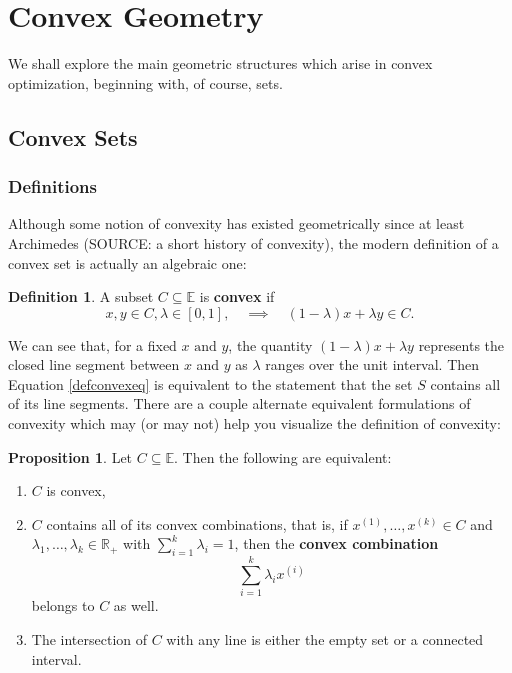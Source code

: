 \documentclass{article}
\numberwithin{equation}{section}
\theoremstyle{definition}
\newtheorem{proposition}[theorem]{Proposition}
\newtheorem{definition}[theorem]{Definition}%
\newcommand{\bE}{\mathbb{E}}
\newcommand{\bR}{\mathbb{R}}
\newcommand{\AND}{\text{ and }}
\begin{document}
\section{Convex Geometry}
We shall explore the main geometric structures which arise in convex optimization, beginning with, of course, sets.
\subsection{Convex Sets}
\subsubsection{Definitions}
Although some notion of convexity has existed geometrically since at least Archimedes (SOURCE: a short history of convexity), the modern definition of a convex set is actually an algebraic one:
\begin{definition}
    \label{defconvex}%
    A subset $C\subseteq\bE$ is \textbf{convex} if
    \begin{equation} \label{defconvexeq}%
    x, y\in C, \lambda\in[0,1],\quad\implies\quad (1-\lambda)x+\lambda y\in C.\end{equation}
\end{definition}
We can see that, for a fixed $x\AND y$, the quantity $(1-\lambda)x+\lambda y$ represents the closed line segment between $x$ and $y$ as $\lambda$ ranges over the unit interval. Then Equation \ref{defconvexeq} is equivalent to the statement that the set $S$ contains all of its line segments. There are a couple alternate equivalent formulations of convexity which may (or may not) help you visualize the definition of convexity:
\begin{proposition}
    Let $C\subseteq\bE$. Then the following are equivalent:
    \begin{enumerate}[label=(\roman*)]
        \item $C$ is convex,
        \item $C$ contains all of its convex combinations, that is, if $x^{(1)}, \dots, x^{(k)}\in C$ and $\lambda_1, \dots, \lambda_k\in\bR_+$ with $\sum_{i=1}^k\lambda_i=1$, then the \textbf{convex combination}\footnotemark
        \begin{equation}\sum_{i=1}^k\lambda_ix^{(i)}\end{equation} belongs to $C$ as well.
        \item The intersection of $C$ with any line is either the empty set or a connected interval.
        \end{enumerate}
\end{proposition}
\end{document}

